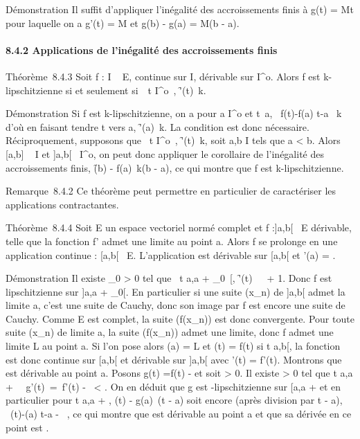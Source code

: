 \documentclass[]{article}
\begin{document}
Démonstration Il suffit d'appliquer l'inégalité des accroissements finis
à g(t) = Mt pour laquelle on a g'(t) = M et g(b) - g(a) = M(b - a).

\paragraph{8.4.2 Applications de l'inégalité des accroissements finis}

Théorème~8.4.3 Soit f : I \rightarrow~ E, continue sur I, dérivable sur
I^o. Alors f est k-lipschitzienne si et seulement
si~\forall~t \in I^o~,
\f'(t)\ \leq k.

Démonstration Si f est k-lipschitzienne, on a pour a \in I^o et
t\neq~a, \ f(t)-f(a)
\over t-a \ \leq k d'où en
faisant tendre t vers a,
\f'(a)\ \leq k. La
condition est donc nécessaire. Réciproquement, supposons que
\forall~t \in I^o~,
\f'(t)\ \leq k, soit a,b
\in I tels que a \textless{} b. Alors {[}a,b{]} \subset~ I et {]}a,b{[}\subset~
I^o, on peut donc appliquer le corollaire de l'inégalité des
accroissements finis, \f(b) -
f(a)\ \leq k(b - a), ce qui montre que f est
k-lipschitzienne.

Remarque~8.4.2 Ce théorème peut permettre en particulier de caractériser
les applications contractantes.

Théorème~8.4.4 Soit E un espace vectoriel normé complet et f :{]}a,b{[}\rightarrow~
E dérivable, telle que la fonction f' admet une limite \ell au point a.
Alors f se prolonge en une application continue
\tildef : {[}a,b{[}\rightarrow~ E. L'application
\tildef est dérivable sur {[}a,b{[} et
\tildef'(a) = \ell.

Démonstration Il existe \eta_0 \textgreater{} 0 tel que
\forall~t \in{]}a,a + \eta_0~{[},
\f'(t)\
\leq\ \ell\ + 1. Donc f est
lipschitzienne sur {]}a,a + \eta_0{[}. En particulier si une suite
(x_n) de {]}a,b{[} admet la limite a, c'est une suite de
Cauchy, donc son image par f est encore une suite de Cauchy. Comme E est
complet, la suite (f(x_n)) est donc convergente. Pour toute
suite (x_n) de limite a, la suite (f(x_n)) admet une
limite, donc f admet une limite L au point a. Si l'on pose alors
\tildef(a) = L et \tildef(t) =
f(t) si t \in{]}a,b{[}, la fonction \tildef est donc
continue sur {[}a,b{[} et dérivable sur {]}a,b{[} avec
\tildef'(t) = f'(t). Montrons que
\tildef est dérivable au point a. Posons g(t)
=\tilde f(t) - \ellt et soit \epsilon \textgreater{} 0. Il
existe \eta \textgreater{} 0 tel que t \in{]}a,a +
\eta{[}\rigtharrow~\ g'(t)\
=\ f'(t) - \ell\
\textless{} \epsilon. On en déduit que g est \epsilon-lipschitzienne sur {[}a,a + \eta{]}
et en particulier pour t \in {[}a,a + \eta{]}, \g(t)
- g(a)\ \leq \epsilon(t - a) soit encore (après division
par t - a), \
\tildef(t)-\tildef(a)
\over t-a - \ell\ \leq \epsilon, ce qui
montre que \tildef est dérivable au point a et que sa
dérivée en ce point est \ell.
\end{document}
